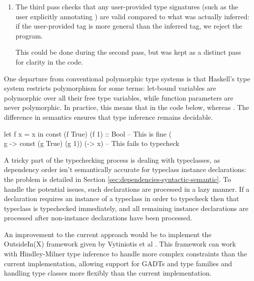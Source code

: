 \documentclass[dissertation.tex]{subfiles}
\begin{document}
{{\begin{enumerate}
{        }
        \item
        {

            The third pass checks that any user-provided type signatures (such as the user explicitly annotating
            ) are valid compared to what was actually inferred: if the user-provided tag is more
            general than the inferred tag, we reject the program.

            This could be done during the second pass, but was kept as a distinct pass for clarity in the code.

        }
        \end{enumerate}

        One departure from conventional polymorphic type systems is that Haskell's type system restricts
        polymorphism for some terms: let-bound variables are polymorphic over all their free type variables, while
        function parameters are never polymorphic. In practice, this means that in the code below,  whereas . The
        difference in semantics ensures that type inference remains decidable.

        \begin{haskellfigure}
        let f x = x in const (f True) (f 1) :: Bool -- This is fine
        (\\g -> const (g True) (g 1)) (\x -> x)     -- This fails to typecheck
        \end{haskellfigure}

        A tricky part of the typechecking process is dealing with typeclasses, as dependency order isn't
        semantically accurate for typeclass instance declarations: the problem is detailed in Section
        \ref{sec:dependencies-syntactic-semantic}. To handle the potential issues, such declarations are processed
        in a lazy manner. If a declaration requires an instance of a typeclass in order to typecheck then that
        typeclass is typechecked immediately, and all remaining instance declarations are processed after
        non-instance declarations have been processed.

        An improvement to the current approach would be to implement the OutsideIn(X) framework given by Vytiniotis
        et al \cite{OutsideIn}. This framework can work with Hindley-Milner type inference to handle more complex
        constraints than the current implementation, allowing support for GADTs and type families and handling type
        classes more flexibly than the current implementation.

}}
\end{document}
